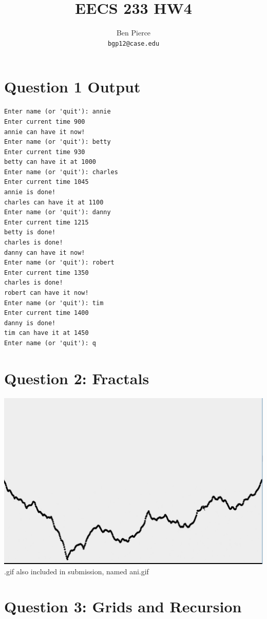\documentclass[12pt]{article} %
\title{EECS 233 HW4}
\author{Ben Pierce \\ \texttt{bgp12@case.edu}}
\begin{document}
\maketitle
\section{Question 1 Output}
\begin{lstlisting}
Enter name (or 'quit'): annie
Enter current time 900
annie can have it now!
Enter name (or 'quit'): betty
Enter current time 930
betty can have it at 1000
Enter name (or 'quit'): charles
Enter current time 1045
annie is done!
charles can have it at 1100
Enter name (or 'quit'): danny
Enter current time 1215
betty is done!
charles is done!
danny can have it now!
Enter name (or 'quit'): robert
Enter current time 1350
charles is done!
robert can have it now!
Enter name (or 'quit'): tim
Enter current time 1400
danny is done!
tim can have it at 1450
Enter name (or 'quit'): q
\end{lstlisting}

\section{Question 2: Fractals}
\includegraphics[scale = 0.5]{Capture.png}\\
.gif also included in submission, named ani.gif

\section{Question 3: Grids and Recursion}
\end{document}
